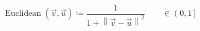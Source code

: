 \documentclass[preview,class=extarticle,14pt]{standalone}
\begin{document}
    \begin{equation*}
        \operatorname{Euclidean}(\vec v,\vec u)
        \coloneqq\dfrac1{1 + \left\lVert\vec v - \vec u\right\rVert^2}
        \qquad\in\left(0,1\right]
    \end{equation*}
\end{document}

